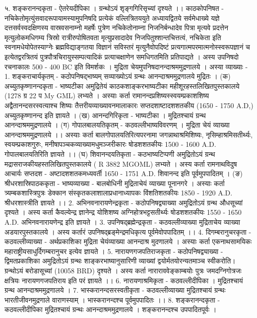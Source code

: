 ५. शङ्करानन्दकृता - ऐतरेयदीपिका । ग्रन्थोऽयं शृङ्गगिरिसृच्यां दृश्यते ।। 
काठकोपनिषत -
नचिकेतोमृत्युंसवादरूपायामस्यामुपनिषदि प्रत्येकं वल्लित्रितययुते अध्यायद्वितये सर्वमेधाख्ये यज्ञे दत्तसर्वस्वदक्षिणस्य वास्रवसनाम्नो महर्षेः पुत्रेण नचिकेतोनाम्ना निजनिर्बन्धादेव पित्रा मृत्यवे प्रदत्तेन मृत्युलोकमधिगम्य त्रिस्रो रात्रीरुपोषितवता मृत्युप्रसादादेव निजपितुश्शान्तचित्तत्वं, नचिकेता इति स्वनामधेयोपेतस्याग्नेः ब्रह्मविद्याङ्गतया विज्ञानं सविस्तरं मृत्युनैवोपदिष्टं प्रत्यगात्मपरमात्मनोस्स्वरूपज्ञानं च इत्येतद्वरत्रितयं पुत्रपौत्रचिरायुस्सम्पत्यादिकं प्रत्याचक्षाणेन समधिगतमिति प्रतिपाद्यते । अस्य उपनिषदो रचनाकालः 500 - 400 BC इति विमर्शकः । मुद्रिता चेयमुपनिषदानन्दाश्रममुद्रणालये । अस्या व्याख्याः - 
1. शङ्कराचार्यकृतम् - कठोपनिषद्भाष्यम् 
सव्याख्योऽयं ग्रन्थः आनन्दाश्रममुद्रणालये मुद्रितः ।
(क) अच्युतकृष्णानन्दकृता - भाष्यटीका 
अमुद्रितेयं काठकशाङ्करभाष्यटीका महीशूरहस्तलिखितपुस्तकालये (1278 ग्र 22 प My GML) लभ्यते ।  
अस्याः कर्ता रामानन्दप्रशिष्यस्स्वयम्प्रकाशशिष्य अद्वैतानन्दसरस्वत्याश्च शिष्यः तैत्तरीयव्याख्यावनमालाकारः सप्तदशाष्टादशशतकीय (1650 - 1750 A.D,) अच्युतकृष्णानन्द इति ज्ञायते ।
(ख) आनन्दगिरिकृता - भाष्यटीका । मुद्रितश्चायं ग्रन्थ आनन्दाश्रममुद्रणालये । 
(ग) गोपालबालयतिकृतम् - कठवल्लीभाष्यविवरणम् । मुद्रिता चेयं व्याख्या आनन्दाश्रममुद्रणालये ।।
अस्याः कर्ता बालगोपालयतिरित्यपरनामा जगन्नाथाश्रमिशिष्यः, नृसिम्हाश्रमिसतीर्थ्यः, स्वयम्प्रकाशगुरुः, मनीषापञ्चकव्याख्यामधुमञ्जरीकारः षोडशशतकीयः 1500 - 1600 A.D. गोपालबालयतिरिति ज्ञायते ।।
(घ) शिवानन्दयतिकृता - कठभाष्यटिप्पणी 
अमुद्रितोऽयं ग्रन्थ मद्रासराजकीयहस्तलिखितपुस्तकालये ( R 3882 MGOML) लभ्यते । अस्य कर्ता रामनाथविदुष आचार्यः सप्तदश - अष्टादशशतकमध्यवर्ती 1650 - 1751 A.D. शिवानन्द इति पूर्वमुपपादितम् ।
(ङ) श्रीधरशास्रिपाठककृता - भाष्यव्याख्या - बालबोधिनी 
मुद्रिताचेयं व्याख्या पूनानगरे । अस्याः कर्ता त्र्यम्बकशास्त्रिपुत्रः डेक्कान संस्कृतकलाशालाप्रधानाध्यापकः विंशतिशतकीयः 1850 - 1920 A.D. श्रीधरशास्त्रीति ज्ञायते ।।
2. अभिनवनारायणेन्द्रकृता - कठोपनिषद्व्याख्या 
अमुद्रितोऽयं ग्रन्थ औधसूच्यां दृश्यते । अस्य कर्ता कैवल्येन्द्र ज्ञानेन्द्र योशिशष्य अग्निहोत्रभट्टसतीर्थ्यः षोडशशतकीयः 1550 - 1650 A.D. अभिनवनारायणेन्द्र इति ज्ञायते । 
3. उपनिषद्ब्रह्मेन्द्रकृता - कठवल्लीव्याख्या 
मुद्रिताचेय व्याख्या अडयारपुस्तकालये । अस्य कर्तारं उपनिषद्ब्रङ्मेन्द्रमधिकृत्य पूर्वमेवोपपादितम् ।। 
4. दिगम्बरानुचरकृता - कठवल्लीव्याख्या - अर्थप्रकाशिका 
मुद्रिता चेयंव्याख्या आनन्दाश्र मुदणालये । अस्याः कर्ता एकनाथसामयिकः महाराष्ट्रीयसाधुर्दिगम्बरानुचर इत्येव ज्ञायते । 
5. नारायणगजपतिराजकृता - कठोपनिषद्व्याख्या - द्विमतप्रकाशिका
अमुद्रितोऽयं ग्रन्थः शाङ्करभाष्यानुसारिणी व्याख्यां द्वयोर्मतयोरन्यतमाञ्च स्वीकरोति। ग्रन्थोऽयं बरोडासूच्यां (10058 BRD) दृश्यते । अस्य कर्ता नाराराववेङ्काम्बयोः पुत्रः जमदग्निगोत्रजः क्षत्रियः नारायणगजपतिराय इति परं ज्ञायते ।।
6. नारायणाश्रमिकृता - कठवल्लीदीपिका । मुद्रितश्चायं ग्रन्थ आनन्दाश्रममुद्रणालये ।  
7. भास्करानन्दसरस्वतीकृता - कठवल्लीव्याख्या 
मुद्रितश्चायं ग्रन्थः भारतीजीवनमुद्रणाले वाराणस्याम् । भास्करानन्दश्च पूर्वमुपपादितः ।।
8. शङ्करानन्दकृता - कठवल्लीदीपिका 
मुद्रितश्चायं ग्रन्थः आनन्दाश्रममुद्रणालये । शङ्करानन्दश्च उपपादितपूर्वः । 

